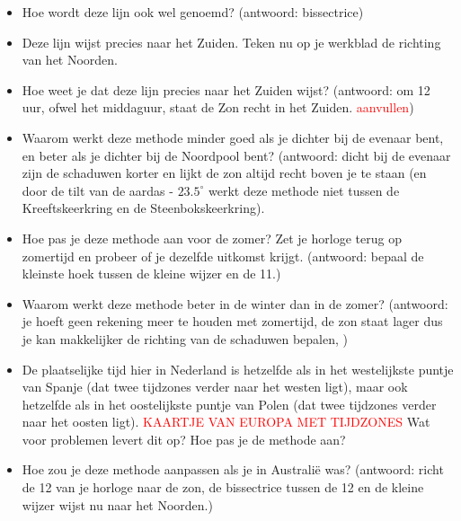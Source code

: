 \begin{itemize}
 \item Hoe wordt deze lijn ook wel genoemd? (antwoord: bissectrice)
 \item Deze lijn wijst precies naar het Zuiden. Teken nu op je werkblad de richting van het Noorden.
 \item Hoe weet je dat deze lijn precies naar het Zuiden wijst? (antwoord: om 12 uur, ofwel het middaguur, staat de Zon recht in het Zuiden. \textcolor{red}{aanvullen})
 \item Waarom werkt deze methode minder goed als je dichter bij de evenaar bent, en beter als je dichter bij de Noordpool bent? (antwoord: dicht bij de evenaar zijn de schaduwen korter en lijkt de zon altijd recht boven je te staan (en door de tilt van de aardas - $23.5^{\circ}$ werkt deze methode niet tussen de Kreeftskeerkring en de Steenbokskeerkring). 
 \item Hoe pas je deze methode aan voor de zomer? Zet je horloge terug op zomertijd en probeer of je dezelfde uitkomst krijgt. (antwoord: bepaal de kleinste hoek tussen de kleine wijzer en de 11.)
 \item Waarom werkt deze methode beter in de winter dan in de zomer? (antwoord: je hoeft geen rekening meer te houden met zomertijd, de zon staat lager dus je kan makkelijker de richting van de schaduwen bepalen, )
 \item De plaatselijke tijd hier in Nederland is hetzelfde als in het westelijkste puntje van Spanje (dat twee tijdzones verder naar het westen ligt), maar ook hetzelfde als in het oostelijkste puntje van Polen (dat twee tijdzones verder naar het oosten ligt). \textcolor{red}{KAARTJE VAN EUROPA MET TIJDZONES} Wat voor problemen levert dit op? Hoe pas je de methode aan?
 \item Hoe zou je deze methode aanpassen als je in Australi\"{e} was? (antwoord: richt de 12 van je horloge naar de zon, de bissectrice tussen de 12 en de kleine wijzer wijst nu naar het Noorden.)
\end{itemize}



